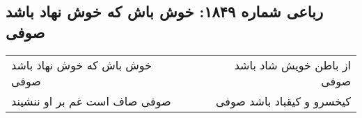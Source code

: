\begin{center}
\section*{رباعی شماره ۱۸۴۹: خوش باش که خوش نهاد باشد صوفی}
\label{sec:1849}
\begin{longtable}{l p{0.5cm} r}
خوش باش که خوش نهاد باشد صوفی
&&
از باطن خویش شاد باشد صوفی
\\
صوفی صاف است غم بر او ننشیند
&&
کیخسرو و کیقباد باشد صوفی
\\
\end{longtable}
\end{center}
